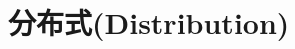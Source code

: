 \documentclass[../../interview-questions.tex]{subfiles}
\begin{document}
\section{分布式(Distribution)}




\end{document}

